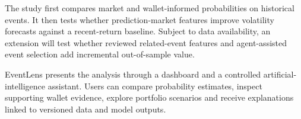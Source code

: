 The study first compares market and wallet-informed probabilities on historical events. It then tests whether prediction-market features improve volatility forecasts against a recent-return baseline. Subject to data availability, an extension will test whether reviewed related-event features and agent-assisted event selection add incremental out-of-sample value.

EventLens presents the analysis through a dashboard and a controlled artificial-intelligence assistant. Users can compare probability estimates, inspect supporting wallet evidence, explore portfolio scenarios and receive explanations linked to versioned data and model outputs.
